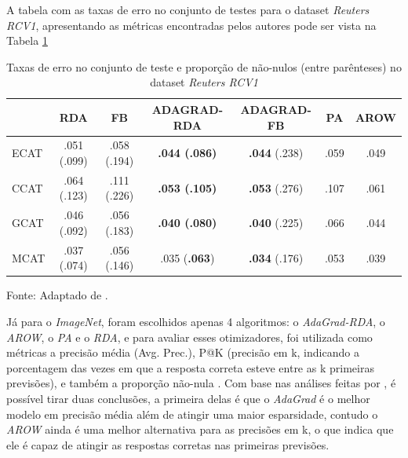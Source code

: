 A tabela com as taxas de erro no conjunto de testes para o dataset \textit{Reuters RCV1}, apresentando as métricas encontradas pelos autores pode ser vista na Tabela \ref{tab:resultados-rcv1-adagrad}

\begin{table}[htbp]
    \centering
    \begin{threeparttable} %
        \caption{Taxas de erro no conjunto de teste e proporção de não-nulos (entre parênteses) no dataset \textit{Reuters RCV1}}
        \label{tab:resultados-rcv1-adagrad}
        \begin{tabular}{l c c c c c c}
            \toprule
             & RDA & FB & ADAGRAD-RDA & ADAGRAD-FB & PA & AROW \\
            \midrule
            ECAT & .051 (.099) & .058 (.194) & \textbf{.044 (.086)} & \textbf{.044} (.238) & .059 & .049 \\
            CCAT & .064 (.123) & .111 (.226) & \textbf{.053 (.105)} & \textbf{.053} (.276) & .107 & .061 \\
            GCAT & .046 (.092) & .056 (.183) & \textbf{.040 (.080)} & \textbf{.040} (.225) & .066 & .044 \\
            MCAT & .037 (.074) & .056 (.146) & .035 (\textbf{.063}) & \textbf{.034} (.176) & .053 & .039 \\
            \bottomrule
        \end{tabular}
        
        \begin{tablenotes}[para] %
            \small %
            \item[] Fonte: Adaptado de \parencite{AdaGradMethod}.
        \end{tablenotes}

    \end{threeparttable} %
\end{table}

Já para o \textit{ImageNet}, foram escolhidos apenas 4 algoritmos: o \textit{AdaGrad-RDA}, o \textit{AROW}, o \textit{PA} e o \textit{RDA}, e para avaliar esses otimizadores, foi utilizada como métricas a precisão média (Avg. Prec.), P@K (precisão em k, indicando a porcentagem das vezes em que a resposta correta esteve entre as k primeiras previsões), e também a proporção não-nula \parencite{AdaGradMethod}. Com base nas análises feitas por \textcite{AdaGradMethod}, é possível tirar duas conclusões, a primeira delas é que o \textit{AdaGrad} é o melhor modelo em precisão média além de atingir uma maior esparsidade, contudo o \textit{AROW} ainda é uma melhor alternativa para as precisões em k, o que indica que ele é capaz de atingir as respostas corretas nas primeiras previsões.


